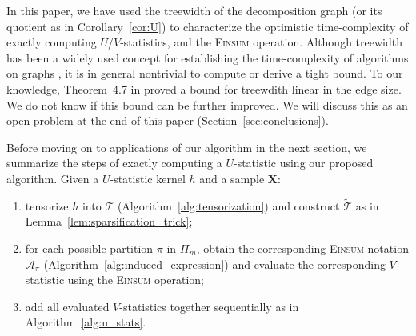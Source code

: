 \documentclass[twoside,11pt]{article}
\def\tilde{\widetilde}
\def\Einsum{\textsc{Einsum}}
\def\tilde{\widetilde}
\def\calA{\mathcal{A}}
\def\calT{\mathcal{T}}
\begin{document}


\begin{remark}
\label{rem:tw}
In this paper, we have used the treewidth of the decomposition graph (or its quotient as in Corollary~\ref{cor:U}) to characterize the optimistic time-complexity of exactly computing $U$/$V$-statistics, and the \Einsum{} operation. Although treewidth has been a widely used concept for establishing the time-complexity of algorithms on graphs \citep{dong2021nearly}, it is in general nontrivial to compute or derive a tight bound. To our knowledge, Theorem~4.7 in \cite{kneis2009bound} proved a bound for treewdith linear in the edge size. We do not know if this bound can be further improved. We will discuss this as an open problem at the end of this paper (Section~\ref{sec:conclusions}).
\end{remark}

Before moving on to applications of our algorithm in the next section, we summarize the steps of exactly computing a $U$-statistic using our proposed algorithm. Given a $U$-statistic kernel $h$ and a sample $\bm{X}$:
\begin{enumerate}[label = (\arabic*)]
\item tensorize $h$ into $\calT$ (Algorithm~\ref{alg:tensorization}) and construct $\tilde{\calT}$ as in Lemma~\ref{lem:sparsification_trick};

\item for each possible partition $\pi$ in $\Pi_{m}$, obtain the corresponding \Einsum{} notation $\calA_{\pi}$ (Algorithm~\ref{alg:induced_expression}) and evaluate the corresponding $V$-statistic using the \Einsum{} operation;

\item add all evaluated $V$-statistics together sequentially as in Algorithm~\ref{alg:u_stats}.
\end{enumerate}
\end{document}
